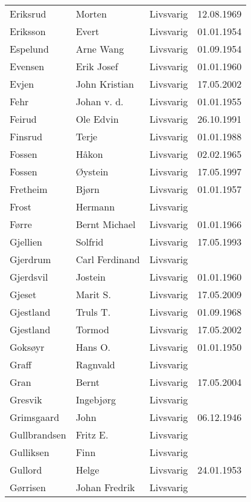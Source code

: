\begin{longtable}{llll}
        Eriksrud	&	Morten	&	Livsvarig 	&	12.08.1969	\\
        Eriksson	&	Evert	&	Livsvarig 	&	01.01.1954	\\
        Espelund	&	Arne Wang	&	Livsvarig 	&	01.09.1954	\\
        Evensen	&	Erik Josef	&	Livsvarig 	&	01.01.1960	\\
        Evjen 	&	John Kristian	&	Livsvarig	&	17.05.2002	\\
        Fehr	&	Johan v. d.	&	Livsvarig 	&	01.01.1955	\\
        Feirud	&	Ole Edvin	&	Livsvarig 	&	26.10.1991	\\
        Finsrud	&	Terje	&	Livsvarig 	&	01.01.1988	\\
        Fossen	&	Håkon	&	Livsvarig 	&	02.02.1965	\\
        Fossen 	&	Øystein	&	Livsvarig	&	17.05.1997	\\
        Fretheim	&	Bjørn	&	Livsvarig 	&	01.01.1957	\\
        Frost	&	Hermann	&	Livsvarig 	&		\\
        Førre	&	Bernt Michael	&	Livsvarig 	&	01.01.1966	\\
        Gjellien	&	Solfrid	&	Livsvarig 	&	17.05.1993	\\
        Gjerdrum	&	Carl Ferdinand	&	Livsvarig 	&		\\
        Gjerdsvil	&	Jostein	&	Livsvarig 	&	01.01.1960	\\
        Gjeset	&	Marit S.	&	Livsvarig	&	17.05.2009	\\
        Gjestland	&	Truls T. 	&	Livsvarig 	&	01.09.1968	\\
        Gjestland 	&	Tormod	&	Livsvarig	&	17.05.2002	\\
        Goksøyr	&	Hans O.	&	Livsvarig 	&	01.01.1950	\\
        Graff	&	Ragnvald	&	Livsvarig 	&		\\
        Gran 	&	Bernt	&	Livsvarig	&	17.05.2004	\\
        Gresvik	&	Ingebjørg	&	Livsvarig 	&		\\
        Grimsgaard	&	John	&	Livsvarig 	&	06.12.1946	\\
        Gullbrandsen	&	Fritz E. 	&	Livsvarig 	&		\\
        Gulliksen	&	Finn	&	Livsvarig 	&		\\
        Gullord	&	Helge	&	Livsvarig 	&	24.01.1953	\\
        Gørrisen	&	Johan Fredrik	&	Livsvarig 	&		\\

\end{longtable}
